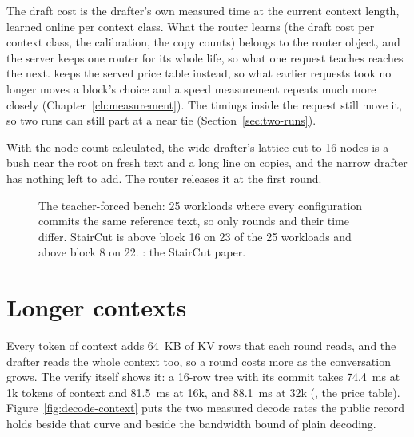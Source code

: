 The draft cost is the drafter's own measured time at the current context length, learned online per context class. What the router learns (the draft cost per context class, the calibration, the copy counts) belongs to the router object, and the server keeps one router for its whole life, so what one request teaches reaches the next.  keeps the served price table instead, so what earlier requests took no longer moves a block's choice and a speed measurement repeats much more closely (Chapter~\ref{ch:measurement}). The timings inside the request still move it, so two runs can still part at a near tie (Section~\ref{sec:two-runs}).

With the node count calculated, the wide drafter's lattice cut to 16 nodes is a bush near the root on fresh text and a long line on copies, and the narrow drafter has nothing left to add. The router releases it at the first round.

\begin{figure}[htbp]
\centering
{}
\caption[The teacher-forced bench]{The teacher-forced bench: 25 workloads where every configuration commits the same reference text, so only rounds and their time differ. StairCut is above block 16 on 23 of the 25 workloads and above block 8 on 22. \measured: the StairCut paper.}\label{fig:forced}
\end{figure}

\section{Longer contexts}

Every token of context adds 64~KB of KV rows that each round reads, and the drafter reads the whole context too, so a round costs more as the conversation grows. The verify itself shows it: a 16-row tree with its commit takes 74.4~ms at 1k tokens of context and 81.5~ms at 16k, and 88.1~ms at 32k (\measured, the price table). Figure~\ref{fig:decode-context} puts the two measured decode rates the public record holds beside that curve and beside the bandwidth bound of plain decoding.

